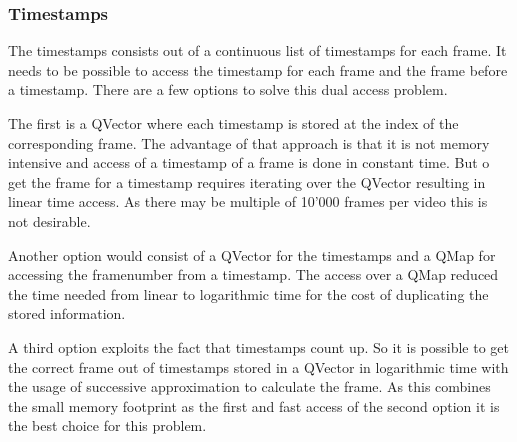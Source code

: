 \subsubsection{Timestamps}
\label{sec:timestamps}
The timestamps consists out of a continuous list of timestamps for each frame. It needs to be possible to access the timestamp for each frame and the frame before a timestamp. There are a few options to solve this dual access problem. 

The first is a QVector where each timestamp is stored at the index of the corresponding frame. The advantage of that approach is that it is not memory intensive and access of a timestamp of a frame is done in constant time. But o get the frame for a timestamp requires iterating over the QVector resulting in linear time access. As there may be multiple of 10'000 frames per video this is not desirable. 

Another option would consist of a QVector for the timestamps and a QMap for accessing the framenumber from a timestamp. The access over a QMap reduced the time needed from linear to logarithmic time for the cost of duplicating the stored information. 

A third option exploits the fact that timestamps count up. So it is possible to get the correct frame out of timestamps stored in a QVector in logarithmic time with the usage of successive approximation to calculate the frame. As this combines the small memory footprint as the first and fast access of the second option it is the best choice for this problem.
